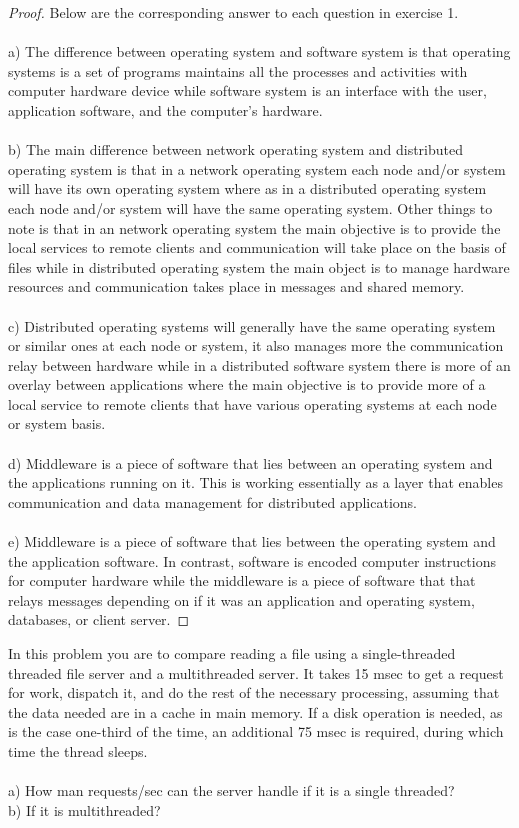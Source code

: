 \documentclass[12pt]{article}
\newenvironment{exercise}[2][Exercise]{\begin{trivlist}
\item[\hskip \labelsep {\bfseries #1}\hskip \labelsep {\bfseries #2.}]}{\end{trivlist}}
\begin{document}
\begin{proof}
Below are the corresponding answer to each question in exercise 1. \\ \\
a) The difference between operating system and software system is that operating systems is a set of programs maintains all the processes and activities with computer hardware device while software system is an interface with the user, application software, and the computer's hardware.\\ \\
b) The main difference between network operating system and distributed operating system is that in a network operating system each node and/or system will have its own operating system where as in a distributed operating system each node and/or system will have the same operating system. Other things to note is that in an network operating system the main objective is to provide the local services to remote clients and communication will take place on the basis of files while in distributed operating system the main object is to manage hardware resources and communication takes place in messages and shared memory. \\ \\
c) Distributed operating systems will generally have the same operating system or similar ones at each node or system, it also manages more the communication relay between hardware while in a distributed software system there is more of an overlay between applications where the main objective is to provide more of a local service to remote clients that have various operating systems at each node or system basis.   \\ \\
d) Middleware is a piece of software that lies between an operating system and the applications running on it. This is working essentially as a layer that enables communication and data management for distributed applications. \\ \\
e) Middleware is a piece of software that lies between the operating system and the application software. In contrast, software is encoded computer instructions for computer hardware while the middleware is a piece of software that that relays messages depending on if it was an application and operating system, databases, or client server. 

\end{proof}
 
\begin{exercise}{2}
In this problem you are to compare reading a file using a single-threaded threaded file server and a multithreaded server. It takes 15 msec to get a request for work, dispatch it, and do the rest of the necessary processing, assuming that the data needed are in a cache in main memory. If a disk operation is needed, as is the case one-third of the time, an additional 75 msec is required, during which time the thread sleeps. \\ \\
a) How man requests/sec can the server handle if it is a single threaded? \\
b) If it is multithreaded?
\end{exercise}
 
\end{document}
